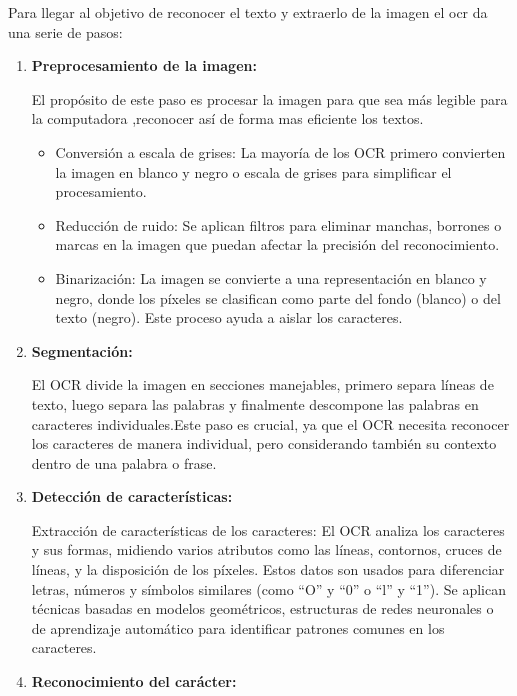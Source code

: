 Para llegar al objetivo de reconocer el texto y extraerlo de la imagen el ocr da una serie de pasos:
\begin{enumerate}
	\item \textbf{Preprocesamiento de la imagen:}
	
	El propósito de este paso es procesar la imagen para que sea más legible para la computadora ,reconocer así de forma mas eficiente los textos.
	\begin{itemize}
		\item Conversión a escala de grises: La mayoría de los OCR primero convierten la imagen en blanco y negro o escala de grises para simplificar el procesamiento.
		\item Reducción de ruido: Se aplican filtros para eliminar manchas, borrones o marcas en la imagen que puedan afectar la precisión del reconocimiento.
		\item Binarización: La imagen se convierte a una representación en blanco y negro, donde los píxeles se clasifican como parte del fondo (blanco) o del texto (negro). Este proceso ayuda a aislar los caracteres.
	\end{itemize}
	
	\item \textbf{Segmentación:}
	
	 El OCR divide la imagen en secciones manejables, primero separa líneas de texto, luego separa las palabras y finalmente descompone las palabras en caracteres individuales.Este paso es crucial, ya que el OCR necesita reconocer los caracteres de manera individual, pero considerando también su contexto dentro de una palabra o frase.
	
	\item \textbf{Detección de características:}
	
	Extracción de características de los caracteres: El OCR analiza los caracteres y sus formas, midiendo varios atributos como las líneas, contornos, cruces de líneas, y la disposición de los píxeles. Estos datos son usados para diferenciar letras, números y símbolos similares (como ``O'' y ``0'' o ``l'' y ``1'').
	Se aplican técnicas basadas en modelos geométricos, estructuras de redes neuronales o de aprendizaje automático para identificar patrones comunes en los caracteres.
	
	\item \textbf{Reconocimiento del carácter:}
	

\end{enumerate}

